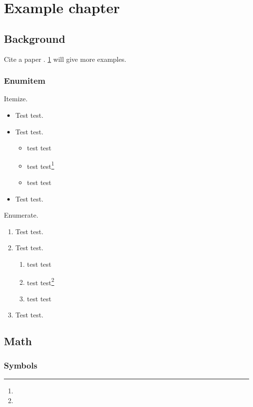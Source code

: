 \chapter{Example chapter}\label{chap:sample}

\section{Background}\label{chap:intro:sec:background}

\blindtext

Cite a paper \cite{test}. \cref{chap:sample} will give more examples.

\subsection{Enumitem}

Itemize.

\begin{itemize}
  \item Test test.
  \item Test test.
  \begin{itemize}
    \item test test
    \item test test\footnote{\blindtext}
    \item test test
  \end{itemize}
  \item Test test.
\end{itemize}

Enumerate.

\begin{enumerate}
  \item Test test.
  \item Test test.
  \begin{enumerate}
    \item test test
    \item test test\footnote{\blindtext}
    \item test test
  \end{enumerate}
  \item Test test.
\end{enumerate}

\section{Math}

\subsection{Symbols}

